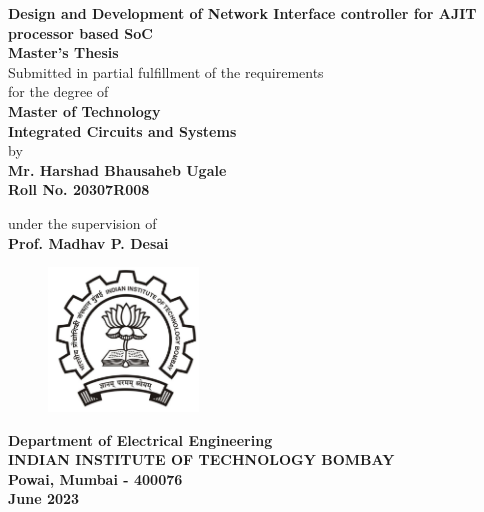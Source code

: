 \documentclass[12pt]{report}
\author{Rajib}
\begin{document}
\renewcommand{\arraystretch}{1.5}
\begin{center}
\Large
\textbf{Design and Development of Network Interface controller for AJIT processor based SoC}\\
\bigskip
\bigskip
\bigskip
\large
\textbf{Master's Thesis}\\
\bigskip
\normalsize
\vspace*{0.5cm}
Submitted in partial fulfillment of the requirements
\\for the degree of\\
\vspace*{.8cm} \textbf{Master of Technology}\\
\textbf{Integrated Circuits and Systems}\\
\vspace*{0.5cm}
by\\
\vspace*{0.5cm}
\textbf{\large Mr. Harshad Bhausaheb Ugale} \\
\textbf{Roll No. 20307R008}\\


\vspace*{0.5cm}

under the supervision of\\
\textbf{Prof. Madhav P. Desai}\\
\vspace*{1cm}


\vspace*{0.5cm}
\begin{figure}[h!]
 \centering
 \includegraphics[width=4cm]{iitb_logo.jpg}
\end{figure}
\bigskip
\textbf{Department of Electrical Engineering}\\
\bigskip
\textbf{INDIAN INSTITUTE OF TECHNOLOGY BOMBAY}\\
\textbf{Powai, Mumbai - 400076}\\
\textbf{June 2023}\\
\end{center}
\thispagestyle{empty}
\end{document}
